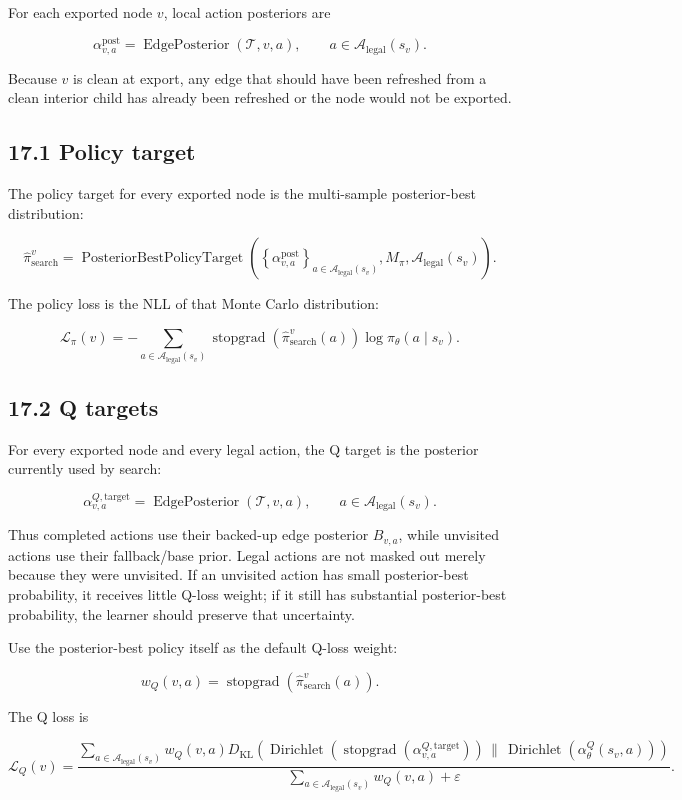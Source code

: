 \documentclass[11pt]{article}
\newcommand{\Dir}{\operatorname{Dirichlet}}
\newcommand{\stopgrad}{\operatorname{stopgrad}}
\newcommand{\Tree}{\mathcal{T}}
\newcommand{\Legal}{\mathcal{A}_{\mathrm{legal}}}
\newcommand{\EdgePosterior}{\operatorname{EdgePosterior}}
\newcommand{\PosteriorBestPolicyTarget}{\operatorname{PosteriorBestPolicyTarget}}
\begin{document}
For each exported node \(v\), local action posteriors are

\[
\alpha^{\mathrm{post}}_{v,a}
=
\EdgePosterior(\Tree,v,a),
\qquad
 a\in\Legal(s_v).
\]

Because \(v\) is clean at export, any edge that should have been refreshed from
a clean interior child has already been refreshed or the node would not be
exported.

\subsection*{17.1 Policy target}

The policy target for every exported node is the multi-sample posterior-best
distribution:

\[
\hat\pi_{\mathrm{search}}^v
=
\PosteriorBestPolicyTarget
\left(
\left\{\alpha^{\mathrm{post}}_{v,a}\right\}_{a\in\Legal(s_v)},
M_\pi,
\Legal(s_v)
\right).
\]

The policy loss is the NLL of that Monte Carlo distribution:

\[
\mathcal{L}_\pi(v)
=
-
\sum_{a\in\Legal(s_v)}
\stopgrad
\left(
\hat\pi_{\mathrm{search}}^v(a)
\right)
\log
\pi_\theta(a\mid s_v).
\]

\subsection*{17.2 Q targets}

For every exported node and every legal action, the Q target is the posterior
currently used by search:

\[
\alpha^{Q,\mathrm{target}}_{v,a}
=
\EdgePosterior(\Tree,v,a),
\qquad
 a\in\Legal(s_v).
\]

Thus completed actions use their backed-up edge posterior \(B_{v,a}\), while
unvisited actions use their fallback/base prior. Legal actions are not masked out
merely because they were unvisited. If an unvisited action has small posterior-best
probability, it receives little Q-loss weight; if it still has substantial
posterior-best probability, the learner should preserve that uncertainty.

Use the posterior-best policy itself as the default Q-loss weight:

\[
w_Q(v,a)=\stopgrad\left(\hat\pi_{\mathrm{search}}^v(a)\right).
\]

The Q loss is

\[
\mathcal{L}_Q(v)
=
\frac{
\sum_{a\in\Legal(s_v)}
 w_Q(v,a)
D_{\mathrm{KL}}
\left(
\Dir
\left(
\stopgrad(\alpha^{Q,\mathrm{target}}_{v,a})
\right)
\,\|\,
\Dir
\left(
\alpha_\theta^Q(s_v,a)
\right)
\right)
}{
\sum_{a\in\Legal(s_v)}w_Q(v,a)+\varepsilon
}.
\]
\end{document}
